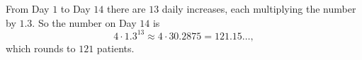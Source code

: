 From Day $1$ to Day $14$ there are $13$ daily increases, each multiplying the number by $1.3$. So the number on Day $14$ is
\[
4\cdot1.3^{13}\approx4\cdot30.2875=121.15\ldots,
\]
which rounds to $\boxed{121}$ patients.
